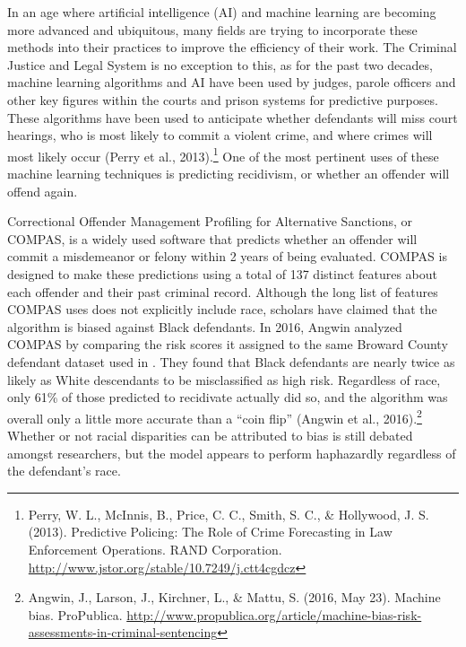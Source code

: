 \documentclass[12pt, ]{article}
\begin{document}
In an age where artificial intelligence (AI) and machine learning are
becoming more advanced and ubiquitous, many fields are trying to
incorporate these methods into their practices to improve the efficiency
of their work. The Criminal Justice and Legal System is no exception to
this, as for the past two decades, machine learning algorithms and AI
have been used by judges, parole officers and other key figures within
the courts and prison systems for predictive purposes. These algorithms
have been used to anticipate whether defendants will miss court
hearings, who is most likely to commit a violent crime, and where crimes
will most likely occur (Perry et al., 2013).\footnote{Perry, W. L.,
  McInnis, B., Price, C. C., Smith, S. C., \& Hollywood, J. S. (2013).
  Predictive Policing: The Role of Crime Forecasting in Law Enforcement
  Operations. RAND Corporation.
  \url{http://www.jstor.org/stable/10.7249/j.ctt4cgdcz}} One of the most
pertinent uses of these machine learning techniques is predicting
recidivism, or whether an offender will offend again.

Correctional Offender Management Profiling for Alternative Sanctions, or
COMPAS, is a widely used software that predicts whether an offender will
commit a misdemeanor or felony within 2 years of being evaluated. COMPAS
is designed to make these predictions using a total of 137 distinct
features about each offender and their past criminal record. Although
the long list of features COMPAS uses does not explicitly include race,
scholars have claimed that the algorithm is biased against Black
defendants. In 2016, Angwin analyzed COMPAS by comparing the risk scores
it assigned to the same Broward County defendant dataset used in
\citep{dressel2018accuracy}. They found that Black defendants are nearly
twice as likely as White descendants to be misclassified as high risk.
Regardless of race, only 61\% of those predicted to recidivate actually
did so, and the algorithm was overall only a little more accurate than a
``coin flip'' (Angwin et al., 2016).\footnote{Angwin, J., Larson, J.,
  Kirchner, L., \& Mattu, S. (2016, May 23). Machine bias. ProPublica.
  \url{http://www.propublica.org/article/machine-bias-risk-assessments-in-criminal-sentencing}}
Whether or not racial disparities can be attributed to bias is still
debated amongst researchers, but the model appears to perform
haphazardly regardless of the defendant's race.
\end{document}
